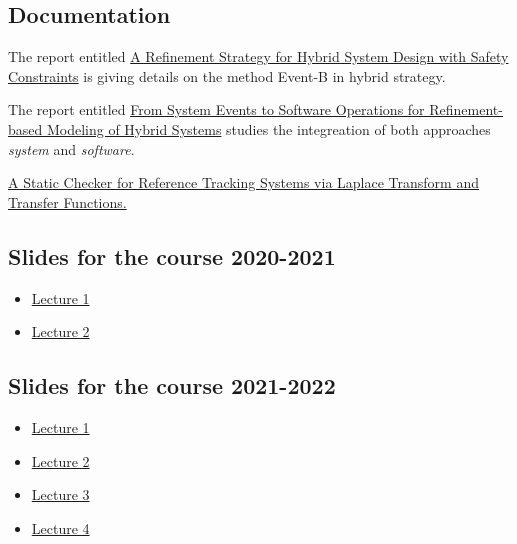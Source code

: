 \documentclass[ 12pt]{article}
\begin{document}
\subsection{Documentation}
\label{sec:documentation}



The report entitled \href{https://inria.hal.science/hal-02895528v1
}{A Refinement Strategy for Hybrid System Design with Safety
  Constraints} is giving details on the method Event-B in hybrid
strategy.


The report entitled 
\href{https://hal.science/hal-04189025v2
}{From System Events to Software Operations for Refinement-based
  Modeling of Hybrid Systems}  studies the integreation of both
approaches  \textit{system} and \textit{software}.


\href{https://hal.science/hal-04152829v1
  }{A Static Checker for Reference Tracking Systems via Laplace Transform and Transfer Functions.}





\subsection{Slides for the course 2020-2021}

\begin{itemize}
\item[]  
  \href{http://mery54.github.io/teaching/mosos/lecturesnotes/2021-01-MLS-00.pdf}{Lecture
    1 }
\item[]  
  \href{http://mery54.github.io/teaching/mosos/lecturesnotes/2021-01-MLS-01.pdf}{Lecture
    2 }
\end{itemize}



\subsection{Slides for the course 2021-2022}

\begin{itemize}
\item[]  
  \href{http://mery54.github.io/teaching/mosos/lecturesnotes/2021-22-MLS-00.pdf}{Lecture
    1 }
\item[]  
  \href{http://mery54.github.io/teaching/mosos/lecturesnotes/2021-22-MLS-01.pdf}{Lecture
    2 }
  \item[]  
  \href{http://mery54.github.io/teaching/mosos/lecturesnotes/2021-22-MLS-02.pdf}{Lecture
    3 }
  \item[]  
  \href{http://mery54.github.io/teaching/mosos/lecturesnotes/2021-22-MLS-03.pdf}{Lecture 4 }
\end{itemize}







\end{document}
